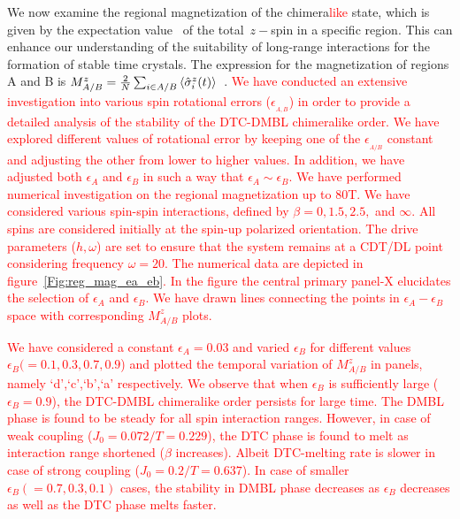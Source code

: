 \documentclass[12pt]{iopart}
\newcommand{\red}[1]{\textcolor{red}{#1}}
\begin{document}
We now examine the regional magnetization of the chimera\red{like} state, which is given by the expectation value  of the total $z-$spin in a specific region. This can enhance our understanding of the suitability of long-range interactions for the formation of stable time crystals. The expression for the magnetization of regions A and B is $M^z_{A/B}=\frac{2}{N}\sum_{i\in{A/B}}\expval{\hat{\sigma}^z_i(t)}$~\cite{sakurai_phys_nodate}. \red{We have conducted an extensive investigation into various spin rotational errors ($\epsilon_{_{A,B}}$) in order to provide a detailed analysis of the stability of the DTC-DMBL chimeralike order. We have explored different values of rotational error by keeping one of the $\epsilon_{_{A/B}}$ constant and adjusting the other from lower to higher values. In addition, we have adjusted both $\epsilon_A$ and $\epsilon_B$ in such a way that $\epsilon_A \sim \epsilon_B$. We have performed  numerical investigation on the regional magnetization up to 80T. We have  considered various spin-spin interactions, defined by $\beta = 0,1.5,2.5,$ and $\infty$. All spins are considered initially at the spin-up polarized orientation. The drive parameters ($h,\omega$) are set to ensure that the system remains at a CDT/DL point considering frequency $\omega =20$. The numerical data are depicted in figure~\ref{Fig:reg_mag_ea_eb}. In the figure the central primary panel-X elucidates the selection of $\epsilon_A$ and $\epsilon_B$. We have drawn lines connecting the points in $\epsilon_A - \epsilon_B$ space with corresponding $M^z_{A/B}$ plots. }
	
\red{We have considered a constant $\epsilon_{A} =0.03$ and varied $\epsilon_B$ for different values $\epsilon_B(= 0.1, 0.3, 0.7,0.9$) and plotted the temporal variation of $M^z_{A/B}$ in panels, namely `d',`c',`b',`a' respectively. We observe that when $\epsilon_B$ is sufficiently large ($\epsilon_B=0.9$), the DTC-DMBL chimeralike order persists for large time. The DMBL phase is found to be steady for all spin interaction ranges. However, in case of weak coupling ($J_0=0.072/T=0.229$), the DTC phase is found to melt as interaction range shortened ($\beta$ increases). Albeit DTC-melting rate is slower in case of strong coupling ($J_0=0.2/T=0.637$). In case of smaller $\epsilon_B (=0.7,0.3,0.1)$ cases, the stability in DMBL phase decreases as $\epsilon_B$ decreases as well as  the DTC phase melts faster.}
\end{document}
